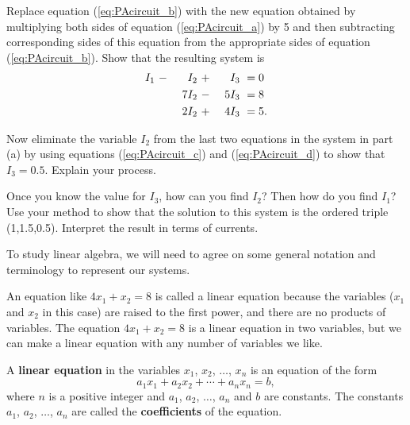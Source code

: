 \begin{pa}
    \ba
            \item Replace equation (\ref{eq:PAcircuit_b}) with the new equation obtained by multiplying both sides of equation (\ref{eq:PAcircuit_a}) by 5 and then subtracting corresponding sides of this equation from the appropriate sides of equation (\ref{eq:PAcircuit_b}).  Show that the resulting system is
        \begin{alignat}{4}
{}I_1 \	&- \	&{}I_2 \	&+ \	&{}I_3 \	&= 0  \notag \\
     \	&  \	&7I_2  \		&{-} \ 	&{5}I_3  \		&= 8 \label{eq:PAcircuit_d} \\
	\	&{} \ 	&2I_2 \		&+ \	&4I_3 \		&= 5. \notag
    \end{alignat}


         \item Now eliminate the variable $I_2$ from the last two equations in the system in part (a) by using equations (\ref{eq:PAcircuit_c}) and (\ref{eq:PAcircuit_d}) to show that $I_3=0.5$. Explain your process. 

        \item Once you know the value for $I_3$, how can you find $I_2$? Then how do you find $I_1$? Use your method to show that the solution to this system is the ordered triple (1,1.5,0.5). Interpret the result in terms of currents. 

	\ea

\ee

\end{pa}


To study linear algebra, we will need to agree on some general notation and terminology to represent our systems. 

An equation like $4x_1 + x_2 = 8$ is called a linear equation because the variables ($x_1$ and $x_2$ in this case) are raised to the first power, and there are no products of variables. The equation $4x_1 + x_2 = 8$ is a linear equation in two variables, but we can make a linear equation with any number of variables we like. 

\begin{definition} A \textbf{linear equation} in the variables $x_1$, $x_2$, $\ldots$, $x_n$ is an equation of the form
\[a_1x_1 + a_2x_2 + \cdots + a_nx_n = b,\]
where $n$ is a positive integer and $a_1$, $a_2$, $\ldots$, $a_n$ and $b$ are constants. The constants $a_1$, $a_2$, $\ldots$, $a_n$ are called the \textbf{coefficients} of the equation. 
\end{definition}

